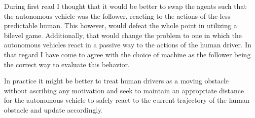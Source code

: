 \documentclass[12pt]{amsart}
\begin{document}
During first read I thought that it would be better to swap the agents such that the autonomous vehicle
was the follower, reacting to the actions of the less predictable human.
This however, would defeat the whole point in utilizing a bilevel game.
Additionally, that would change the problem to one in which the autonomous vehicles react in a 
passive way to the actions of the human driver.
In that regard I have come to agree with the choice of machine as the follower
being the correct way to evaluate this behavior.

In practice it might be better to treat human drivers as a moving obstacle without ascribing any motivation
and seek to maintain an appropriate distance for the autonomous vehicle to safely react to the current
trajectory of the human obstacle and update accordingly.

\begin{bibdiv}
	\begin{biblist}
	\end{biblist}
\end{bibdiv}
\end{document}
